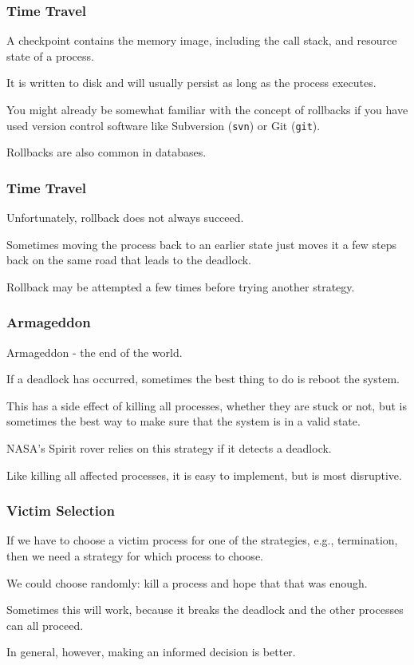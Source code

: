 \begin{frame}
\frametitle{Time Travel}

A checkpoint contains the memory image, including the call stack, and resource state of a process. 

It is written to disk and will usually persist as long as the process executes. 

You might already be somewhat familiar with the concept of rollbacks if you have used version control software like Subversion (\texttt{svn}) or Git (\texttt{git}).

Rollbacks are also common in databases.

\end{frame}

\begin{frame}
\frametitle{Time Travel}

Unfortunately, rollback does not always succeed. 

Sometimes moving the process back to an earlier state just moves it a few steps back on the same road that leads to the deadlock.  

Rollback may be attempted a few times before trying another strategy.

\end{frame}

\begin{frame}
\frametitle{Armageddon}

Armageddon - the end of the world. 

If a deadlock has occurred, sometimes the best thing to do is reboot the system. 

This has a side effect of killing all processes, whether they are stuck or not, but is sometimes the best way to make sure that the system is in a valid state. 

NASA's Spirit rover relies on this strategy if it detects a deadlock. 

Like killing all affected processes, it is easy to implement, but is most disruptive.

\end{frame}

\begin{frame}
\frametitle{Victim Selection}

If we have to choose a victim process for one of the strategies, e.g., termination, then we need a strategy for which process to choose. 

We could choose randomly: kill a process and hope that that was enough. 

Sometimes this will work, because it breaks the deadlock and the other processes can all proceed. 

In general, however, making an informed decision is better. 

\end{frame}

